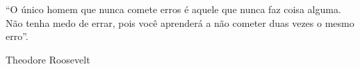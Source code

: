

\begin{flushright}
\begin{minipage}[r]{10cm}
\vspace{18cm}
``O único homem que nunca comete erros é aquele que nunca faz coisa alguma. Não tenha medo de errar, pois você aprenderá a não cometer duas vezes o mesmo erro''.
\begin{flushright}
Theodore Roosevelt
\end{flushright}
\end{minipage}
\end{flushright}